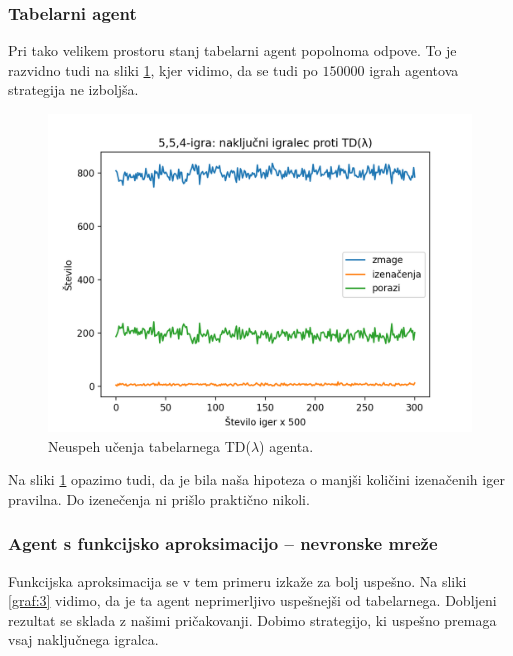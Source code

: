 \documentclass[12pt,a4paper]{amsart}
\theoremstyle{definition} %
\theoremstyle{plain} %
\begin{document}
\subsubsection{Tabelarni agent}
Pri tako velikem prostoru stanj tabelarni agent popolnoma odpove. To je razvidno tudi na sliki \ref{graf:2}, 
kjer vidimo, da se tudi po $150000$ igrah agentova strategija ne izboljša. 

\begin{figure}[H]
    \includegraphics[scale=0.715]{../rezultati/tdl-554-150000-2.png}
    \caption{Neuspeh učenja tabelarnega TD($\lambda$) agenta.}
    \label{graf:2}
\end{figure}

Na sliki \ref{graf:2} opazimo tudi, da je bila naša hipoteza o manjši količini izenačenih iger pravilna. Do izenečenja 
ni prišlo praktično nikoli.

\subsubsection{Agent s funkcijsko aproksimacijo -- nevronske mreže}
Funkcijska aproksimacija se v tem primeru izkaže za bolj uspešno. Na sliki \ref{graf:3} vidimo, da je ta agent 
neprimerljivo uspešnejši od tabelarnega. Dobljeni rezultat se sklada z našimi pričakovanji. Dobimo 
strategijo, ki uspešno premaga vsaj naključnega igralca.
\end{document}
